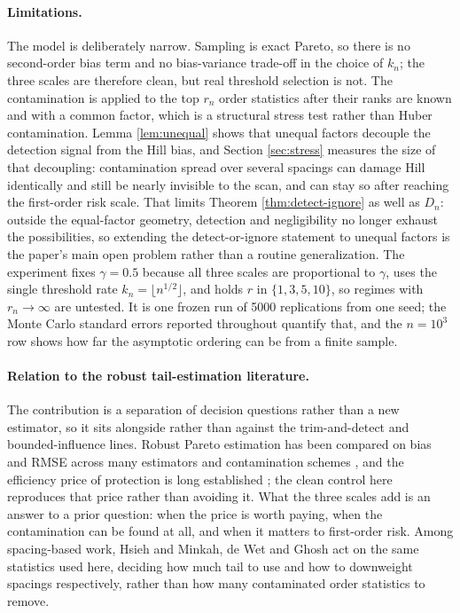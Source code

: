 \documentclass[11pt]{article}
\begin{document}
\paragraph{Limitations.}
The model is deliberately narrow.  Sampling is exact Pareto, so there is no
second-order bias term and no bias-variance trade-off in the choice of $k_n$;
the three scales are therefore clean, but real threshold selection is not.  The
contamination is applied to the top $r_n$ order statistics after their ranks
are known and with a common factor, which is a structural stress test rather
than Huber contamination.  Lemma \ref{lem:unequal} shows that unequal factors
decouple the detection signal from the Hill bias, and Section
\ref{sec:stress} measures the size of that decoupling: contamination spread
over several spacings can damage Hill identically and still be nearly
invisible to the scan, and can stay so after reaching the first-order risk
scale.  That limits Theorem \ref{thm:detect-ignore} as well as $D_n$: outside
the equal-factor geometry, detection and negligibility no longer exhaust the
possibilities, so extending the detect-or-ignore statement to unequal factors
is the paper's main open problem rather than a routine generalization.  The experiment fixes $\gamma=0.5$
because all three scales are proportional to $\gamma$, uses the single
threshold rate $k_n=\lfloor n^{1/2}\rfloor$, and holds $r$ in $\{1,3,5,10\}$, so
regimes with $r_n\to\infty$ are untested.  It is one frozen run of 5000
replications from one seed; the Monte Carlo standard errors reported throughout
quantify that, and the $n=10^3$ row shows how far the asymptotic ordering can
be from a finite sample.

\paragraph{Relation to the robust tail-estimation literature.}
The contribution is a separation of decision questions rather than a new
estimator, so it sits alongside rather than against the trim-and-detect and
bounded-influence lines.  Robust Pareto estimation has been compared on bias
and RMSE across many estimators and contamination schemes
\citep{brzezinski-2016}, and the efficiency price of protection is long
established \citep{brazauskas-serfling-2000,finkelstein-tucker-veeh-2006}; the
clean control here reproduces that price rather than avoiding it.  What the
three scales add is an answer to a prior question: when the price is worth
paying, when the contamination can be found at all, and when it matters to
first-order risk.  Among spacing-based work, Hsieh \citeyearpar{hsieh-1999} and
Minkah, de Wet and Ghosh \citeyearpar{minkah-dewet-ghosh-2023} act on the same
statistics used here, deciding how much tail to use and how to downweight
spacings respectively, rather than how many contaminated order statistics to
remove.
\end{document}
